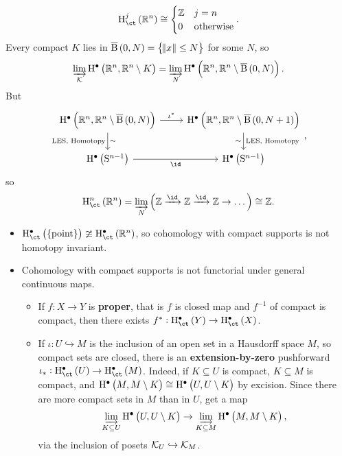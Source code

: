 \begin{example*}
$$ \Hc^j\br{\RR^n} \cong
\begin{cases}
\ZZ & j = n \\
0 & \text{otherwise}
\end{cases}.
$$
Every compact $ K $ lies in $ \overline{\B}\br{0, N} = \cbr{\norm{x} \le N} $ for some $ N $, so
$$ \varinjlim_\KKK \H^\bullet\br{\RR^n, \RR^n \setminus K} = \varinjlim_N \H^\bullet\br{\RR^n, \RR^n \setminus \overline{\B}\br{0, N}}. $$
But
$$
\begin{tikzcd}
\H^\bullet\br{\RR^n, \RR^n \setminus \overline{\B}\br{0, N}} \arrow{r}{\iota^*} \arrow{d}{\sim}[swap]{\text{LES, Homotopy}} & \H^\bullet\br{\RR^n, \RR^n \setminus \overline{\B}\br{0, N + 1}} \arrow{d}{\text{LES, Homotopy}}[swap]{\sim} \\
\H^\bullet\br{\S^{n - 1}} \arrow{r}[swap]{\id} & \H^\bullet\br{\S^{n - 1}}
\end{tikzcd},
$$
so
$$ \Hc^n\br{\RR^n} = \varinjlim_N \br{\ZZ \xrightarrow{\id} \ZZ \xrightarrow{\id} \ZZ \to \dots} \cong \ZZ. $$
\end{example*}

\begin{remark*}
\hfill
\begin{itemize}
\item $ \Hc^\bullet\br{\pt} \ncong \Hc^\bullet\br{\RR^n} $, so cohomology with compact supports is not homotopy invariant.
\item Cohomology with compact supports is not functorial under general continuous maps.
\begin{itemize}
\item If $ f : X \to Y $ is \textbf{proper}, that is $ f $ is closed map and $ f^{-1} $ of compact is compact, then there exists $ f^* : \Hc^\bullet\br{Y} \to \Hc^{\bullet}\br{X} $.
\item If $ \iota : U \hookrightarrow M $ is the inclusion of an open set in a Hausdorff space $ M $, so compact sets are closed, there is an \textbf{extension-by-zero} pushforward $ \iota_* : \Hc^\bullet\br{U} \to \Hc^\bullet\br{M} $. Indeed, if $ K \subseteq U $ is compact, $ K \subseteq M $ is compact, and $ \H^\bullet\br{M, M \setminus K} \cong \H^\bullet\br{U, U \setminus K} $ by excision. Since there are more compact sets in $ M $ than in $ U $, get a map
$$ \varinjlim_{K \subseteq U} \H^\bullet\br{U, U \setminus K} \to \varinjlim_{K \subseteq M} \H^\bullet\br{M, M \setminus K}, $$
via the inclusion of posets $ \mathcal{K}_U \hookrightarrow \mathcal{K}_M $.
\end{itemize}
\end{itemize}
\end{remark*}


